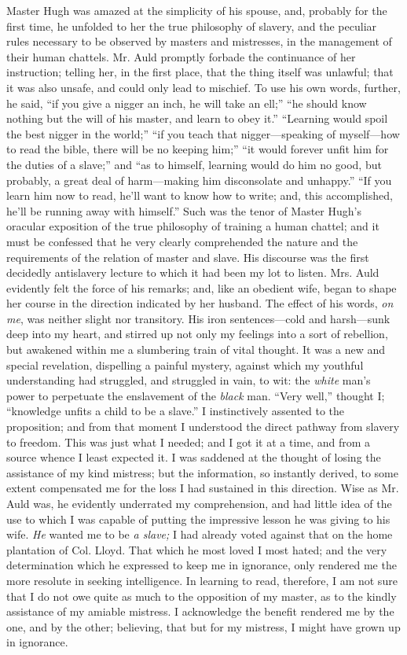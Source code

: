 Master Hugh was amazed at the simplicity of his spouse, and, probably
for the first time, he unfolded to her the true philosophy of slavery,
and the peculiar rules necessary to be observed by masters and
mistresses, in the management of their human chattels. Mr. Auld promptly
forbade the continuance of her instruction; telling her, in the first
place, that the thing itself was unlawful; that it was also unsafe, and
could only lead to mischief. To use his own words, {}further, he said,
``if you give a nigger an inch, he will take an ell;'' ``he should know
nothing but the will of his master, and learn to obey it.'' ``Learning
would spoil the best nigger in the world;'' ``if you teach that
nigger---speaking of myself---how to read the bible, there will be no
keeping him;'' ``it would forever unfit him for the duties of a slave;''
and ``as to himself, learning would do him no good, but probably, a
great deal of harm---making him disconsolate and unhappy.'' ``If you
learn him now to read, he'll want to know how to write; and, this
accomplished, he'll be running away with himself.'' Such was the tenor
of Master Hugh's oracular exposition of the true philosophy of training
a human chattel; and it must be confessed that he very clearly
comprehended the nature and the requirements of the relation of master
and slave. His discourse was the first decidedly antislavery lecture to
which it had been my lot to listen. Mrs. Auld evidently felt the force
of his remarks; and, like an obedient wife, began to shape her course in
the direction indicated by her husband. The effect of his words,
\emph{on me}, was neither slight nor transitory. His iron
sentences---cold and harsh---sunk deep into my heart, and stirred up not
only my feelings into a sort of rebellion, but awakened within me a
slumbering train of vital thought. It was a new and special revelation,
dispelling a painful mystery, against which my youthful understanding
had struggled, and struggled in vain, to wit: the \emph{white} man's
power to perpetuate the enslavement of the \emph{black} man. ``Very
well,'' thought I; ``knowledge unfits a child to be a slave.'' I
instinctively assented to the proposition; {}and from that moment I
understood the direct pathway from slavery to freedom. This was just
what I needed; and I got it at a time, and from a source whence I least
expected it. I was saddened at the thought of losing the assistance of
my kind mistress; but the information, so instantly derived, to some
extent compensated me for the loss I had sustained in this direction.
Wise as Mr. Auld was, he evidently underrated my comprehension, and had
little idea of the use to which I was capable of putting the impressive
lesson he was giving to his wife. \emph{He} wanted me to be \emph{a
slave;} I had already voted against that on the home plantation of Col.
Lloyd. That which he most loved I most hated; and the very determination
which he expressed to keep me in ignorance, only rendered me the more
resolute in seeking intelligence. In learning to read, therefore, I am
not sure that I do not owe quite as much to the opposition of my master,
as to the kindly assistance of my amiable mistress. I acknowledge the
benefit rendered me by the one, and by the other; believing, that but
for my mistress, I might have grown up in ignorance.

